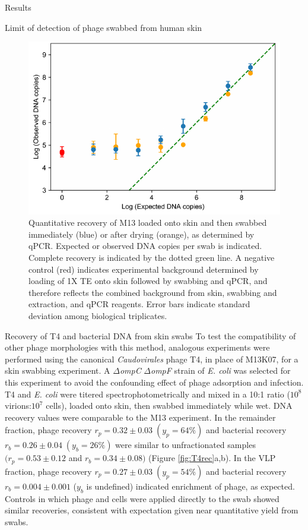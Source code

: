\documentclass[oneside,12pt,final]{sty/ucthesis-CA2012}
\begin{document}
\begin{mainmatter}
\begin{section}{Results}
\begin{subsection}{Limit of detection of phage swabbed from human skin}
\begin{figure}
\centering
\centerline{\includegraphics[width=\textwidth]{fig/C2fig4.pdf}}
\caption{Quantitative recovery of M13 loaded onto skin and then swabbed immediately (blue) or after drying (orange), as determined by qPCR. Expected or observed DNA copies per swab is indicated. Complete recovery is indicated by the dotted green line. A negative control (red) indicates experimental background determined by loading of 1X TE onto skin followed by swabbing and qPCR, and therefore reflects the combined background from skin, swabbing and extraction, and qPCR reagents. Error bars indicate standard deviation among biological triplicates.}
\label{fig:M13crv}
\end{figure}
\end{subsection}

\begin{subsection}{Recovery of T4 and bacterial DNA from skin swabs} %
To test the compatibility of other phage morphologies with this method, analogous experiments were performed using the canonical \textit{Caudovirales} phage T4, in place of M13K07, for a skin swabbing experiment. A $\Delta$\textit{ompC} $\Delta$\textit{ompF} strain of \textit{E. coli} was selected for this experiment to avoid the confounding effect of phage adsorption and infection. T4 and \textit{E. coli} were titered spectrophotometrically and mixed in a 10:1 ratio ($10^{8}$ virions:$10^{7}$ cells), loaded onto skin, then swabbed immediately while wet. DNA recovery values were comparable to the M13 experiment. In the remainder fraction, phage recovery $r_{p} = 0.32 \pm 0.03\; (y_{p} = 64\%)$ and bacterial recovery $r_{b} = 0.26 \pm 0.04\; (y_{b} = 26\%)$ were similar to unfractionated samples $(r_{p} = 0.53 \pm 0.12$ and $r_{b} = 0.34 \pm 0.08)$ (Figure \ref{fig:T4rec}a,b). In the VLP fraction, phage recovery $r_{p} = 0.27 \pm 0.03\; (y_{p} = 54\%)$ and bacterial recovery $r_{b} = 0.004 \pm 0.001$ ($y_{b}$ is undefined) indicated enrichment of phage, as expected. Controls in which phage and cells were applied directly to the swab showed similar recoveries, consistent with expectation given near quantitative yield from swabs.


\end{subsection}
\end{section}
\end{mainmatter}
\end{document}
